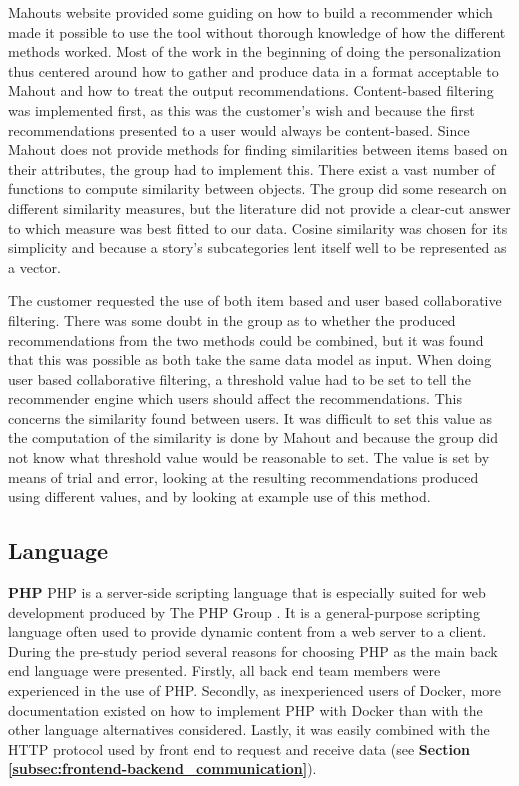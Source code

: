 Mahouts website provided some guiding on how to build a recommender which made it possible to use the tool without thorough knowledge of how the different methods worked. Most of the work in the beginning of doing the personalization thus centered around how to gather and produce data in a format acceptable to Mahout and how to treat the output recommendations. Content-based filtering was implemented first, as this was the customer's wish and because the first recommendations presented to a user would always be content-based. Since Mahout does not provide methods for finding similarities between items based on their attributes, the group had to implement this. There exist a vast number of functions to compute similarity between objects. The group did some research on different similarity measures, but the literature did not provide a clear-cut answer to which measure was best fitted to our data. Cosine similarity was chosen for its simplicity and because a story's subcategories lent itself well to be represented as a vector.\newline

The customer requested the use of both item based and user based collaborative filtering. There was some doubt in the group as to whether the produced recommendations from the two methods could be combined, but it was found that this was possible as both take the same data model as input. When doing user based collaborative filtering, a threshold value had to be set to tell the recommender engine which users should affect the recommendations. This concerns the similarity found between users. It was difficult to set this value as the computation of the similarity is done by Mahout and because the group did not know what threshold value would be reasonable to set. The value is set by means of trial and error, looking at the resulting recommendations produced using different values, and by looking at example use of this method. 

\subsection{Language}
\label{subsec:backend_language}
\textbf{PHP}\newline
PHP is a server-side scripting language that is especially suited for web development produced by The PHP Group \cite{HM8}. It is a general-purpose scripting language often used to provide dynamic content from a web server to a client. During the pre-study period several reasons for choosing PHP as the main back end language were presented. Firstly, all back end team members were experienced in the use of PHP. Secondly, as inexperienced users of Docker, more documentation existed on how to implement PHP with Docker than with the other language alternatives considered.  Lastly, it was easily combined with the HTTP protocol used by front end to request and receive data (see \textbf{Section \ref{subsec:frontend-backend_communication}}).\newline


